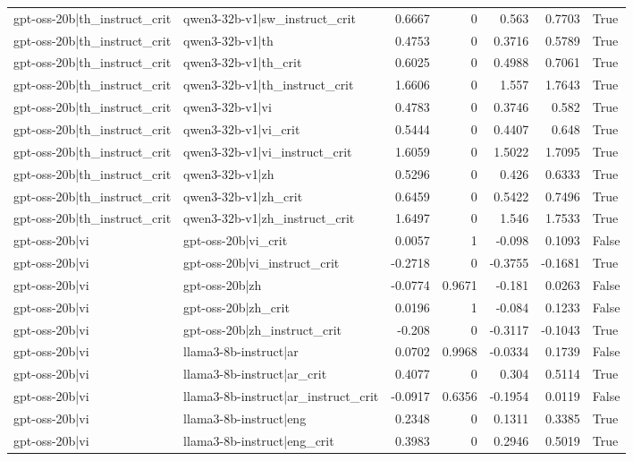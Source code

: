 \begin{table}
\begin{tabular}{l l r r r r l}
gpt-oss-20b|th_instruct_crit & qwen3-32b-v1|sw_instruct_crit & 0.6667 & 0 & 0.563 & 0.7703 & True \\
gpt-oss-20b|th_instruct_crit & qwen3-32b-v1|th & 0.4753 & 0 & 0.3716 & 0.5789 & True \\
gpt-oss-20b|th_instruct_crit & qwen3-32b-v1|th_crit & 0.6025 & 0 & 0.4988 & 0.7061 & True \\
gpt-oss-20b|th_instruct_crit & qwen3-32b-v1|th_instruct_crit & 1.6606 & 0 & 1.557 & 1.7643 & True \\
gpt-oss-20b|th_instruct_crit & qwen3-32b-v1|vi & 0.4783 & 0 & 0.3746 & 0.582 & True \\
gpt-oss-20b|th_instruct_crit & qwen3-32b-v1|vi_crit & 0.5444 & 0 & 0.4407 & 0.648 & True \\
gpt-oss-20b|th_instruct_crit & qwen3-32b-v1|vi_instruct_crit & 1.6059 & 0 & 1.5022 & 1.7095 & True \\
gpt-oss-20b|th_instruct_crit & qwen3-32b-v1|zh & 0.5296 & 0 & 0.426 & 0.6333 & True \\
gpt-oss-20b|th_instruct_crit & qwen3-32b-v1|zh_crit & 0.6459 & 0 & 0.5422 & 0.7496 & True \\
gpt-oss-20b|th_instruct_crit & qwen3-32b-v1|zh_instruct_crit & 1.6497 & 0 & 1.546 & 1.7533 & True \\
gpt-oss-20b|vi & gpt-oss-20b|vi_crit & 0.0057 & 1 & -0.098 & 0.1093 & False \\
gpt-oss-20b|vi & gpt-oss-20b|vi_instruct_crit & -0.2718 & 0 & -0.3755 & -0.1681 & True \\
gpt-oss-20b|vi & gpt-oss-20b|zh & -0.0774 & 0.9671 & -0.181 & 0.0263 & False \\
gpt-oss-20b|vi & gpt-oss-20b|zh_crit & 0.0196 & 1 & -0.084 & 0.1233 & False \\
gpt-oss-20b|vi & gpt-oss-20b|zh_instruct_crit & -0.208 & 0 & -0.3117 & -0.1043 & True \\
gpt-oss-20b|vi & llama3-8b-instruct|ar & 0.0702 & 0.9968 & -0.0334 & 0.1739 & False \\
gpt-oss-20b|vi & llama3-8b-instruct|ar_crit & 0.4077 & 0 & 0.304 & 0.5114 & True \\
gpt-oss-20b|vi & llama3-8b-instruct|ar_instruct_crit & -0.0917 & 0.6356 & -0.1954 & 0.0119 & False \\
gpt-oss-20b|vi & llama3-8b-instruct|eng & 0.2348 & 0 & 0.1311 & 0.3385 & True \\
gpt-oss-20b|vi & llama3-8b-instruct|eng_crit & 0.3983 & 0 & 0.2946 & 0.5019 & True \\

\end{tabular}
\end{table}
